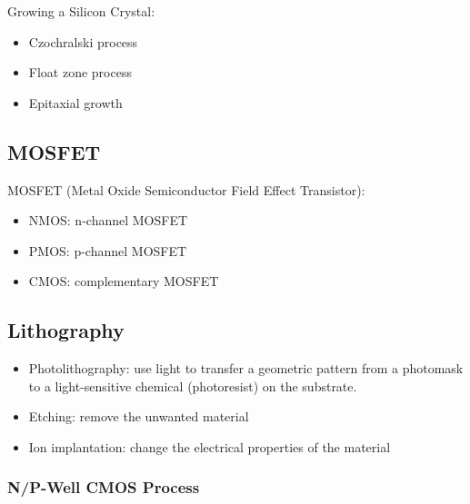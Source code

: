 Growing a Silicon Crystal: \begin{itemize}
    \item Czochralski process
    \item Float zone process
    \item Epitaxial growth
\end{itemize}

\subsection{MOSFET}

MOSFET (Metal Oxide Semiconductor Field Effect Transistor): \begin{itemize}
    \item NMOS: n-channel MOSFET
    \item PMOS: p-channel MOSFET
    \item CMOS: complementary MOSFET
\end{itemize}

\subsection{Lithography}

\begin{itemize}
    \item Photolithography: use light to transfer a geometric pattern from a photomask to a light-sensitive chemical (photoresist) on the substrate.
    \item Etching: remove the unwanted material
    \item Ion implantation: change the electrical properties of the material
\end{itemize}

\subsubsection{N/P-Well CMOS Process}

